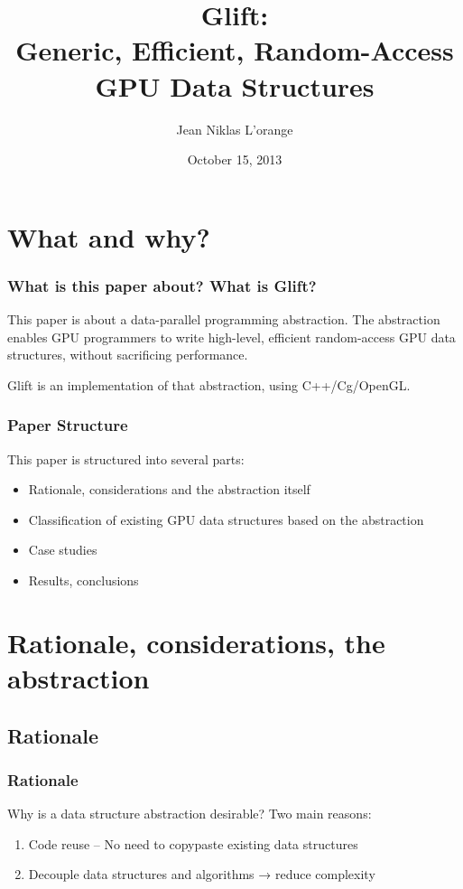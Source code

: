 \documentclass[xcolor={usenames,dvipsnames}]{beamer}
\title[Glift: Generic, Efficient, Random-Access GPU Data Structures]%
      {Glift:\\ Generic, Efficient, Random-Access GPU Data Structures}
\author{Jean Niklas L'orange}
\institute{\texttt{jeannikl@hypirion.com}}
\date{October 15, 2013}
\begin{document}
\begin{frame}
  \titlepage
\end{frame}

\section{What and why?}
\begin{frame}
  \frametitle{What is this paper about? What is Glift?}

  This paper is about a data-parallel programming abstraction. The abstraction
  enables GPU programmers to write high-level, efficient random-access GPU data
  structures, without sacrificing performance.

  \vfill \pause

  Glift is an implementation of that abstraction, using C++/Cg/OpenGL.
\end{frame}

\begin{frame}
  \frametitle{Paper Structure}

  This paper is structured into several parts:
  \begin{itemize}
  \item<2-> Rationale, considerations and the abstraction itself
  \item<3-> Classification of existing GPU data structures based on the
    abstraction
  \item<4-> Case studies
  \item<5-> Results, conclusions
  \end{itemize}
\end{frame}

\section{Rationale, considerations, the abstraction}
\subsection{Rationale}
\begin{frame}
  \frametitle{Rationale}

  Why is a data structure abstraction desirable? Two main reasons:
  \begin{enumerate}
  \item<2-> Code reuse -- No need to copypaste existing data structures
  \item<3-> Decouple data structures and algorithms → reduce complexity
  \end{enumerate}
\end{frame}
\end{document}
